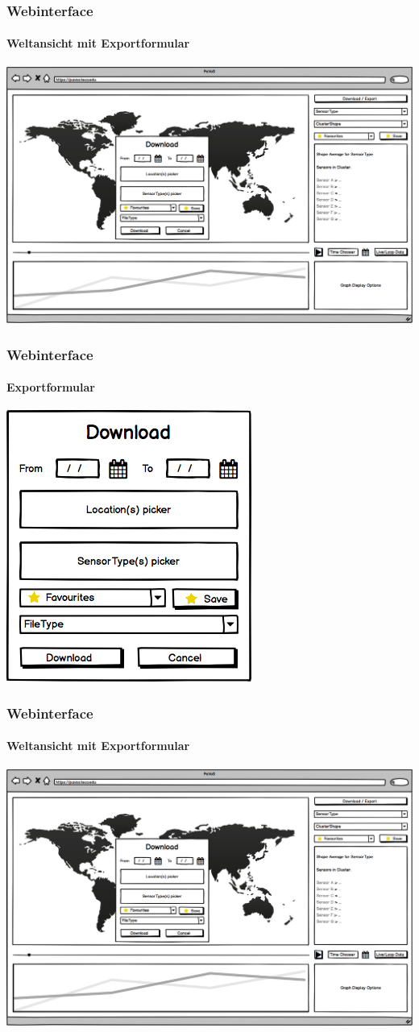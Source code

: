 \documentclass{beamer}
\begin{document}
\begin{frame}
	\frametitle{Webinterface}
	\framesubtitle{Weltansicht mit Exportformular}
	\centering
	\includegraphics[width=\linewidth]{gui/frontend/FrontGUIWorldWithExportForm}
\end{frame}

\begin{frame}
	\frametitle{Webinterface}
	\framesubtitle{Exportformular}
	\centering
	\includegraphics[height=0.6\textheight]{gui/frontend/FrontGUIExportForm}
\end{frame}

\begin{frame}
	\frametitle{Webinterface}
	\framesubtitle{Weltansicht mit Exportformular}
	\centering
	\includegraphics[width=\linewidth]{gui/frontend/FrontGUIWorldWithExportForm}
\end{frame}
\end{document}
